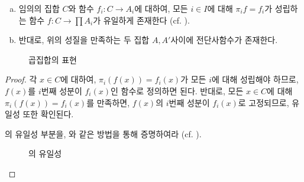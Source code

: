 \begin{theorem}
\label{thm:productset}
    \begin{enumerate}[(a)]
        \item 임의의 집합 $C$와 함수 $f_i: C \to A_i$에 대하여, 모든 $i \in I$에 대해 $\pi_i f = f_i$가 성립하는 함수 $f: C \to \prod A_i$가 유일하게 존재한다 (cf. ).
        \item 반대로, 위의 성질을 만족하는 두 집합 $A, A'$사이에 전단사함수가 존재한다.
    \end{enumerate}
\end{theorem}
\begin{figure}[ht]
    \centering
{}
    \caption{곱집합의 표현}
    \label{fig:productset}
\end{figure}
\begin{proof}
    각 $x \in C$에 대하여, $\pi_i(f(x)) = f_i(x)$가 모든 $i$에 대해 성립해야 하므로, $f(x)$를 $i$번째 성분이 $f_i(x)$인 함수로 정의하면 된다.
    반대로, 모든 $x \in C$에 대해 $\pi_i(f(x)) = f_i(x)$를 만족하면, $f(x)$의 $i$번째 성분이 $f_i(x)$로 고정되므로, 유일성 또한 확인된다.
\begin{exercise}
    의 유일성 부분을, 와 같은 방법을 통해 증명하여라 (cf. ).
\end{exercise}
    \begin{figure}[ht]
        \centering
{}
        \caption{의 유일성}
        \label{fig:productsetunique}
    \end{figure}
\end{proof}

